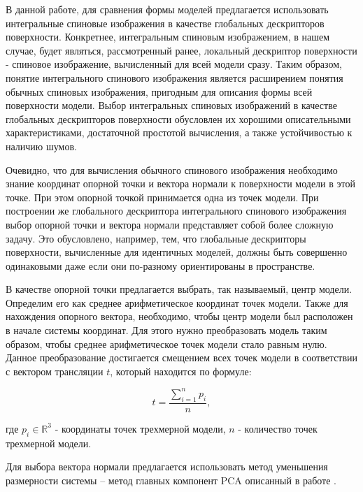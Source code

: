 \documentclass[14pt]{article}
\numberwithin{figure}{section}
\numberwithin{equation}{section}
\begin{document}
В данной работе, для сравнения формы моделей предлагается использовать интегральные спиновые изображения в качестве глобальных дескрипторов поверхности. Конкретнее, интегральным спиновым изображением, в нашем случае, будет являться, рассмотренный ранее, локальный дескриптор поверхности - спиновое изображение, вычисленный для всей модели сразу. Таким образом, понятие интегрального спинового изображения является расширением понятия обычных спиновых изображения, пригодным для описания формы всей поверхности модели.
Выбор интегральных спиновых изображений в качестве глобальных дескрипторов поверхности обусловлен их хорошими описательными характеристиками, достаточной простотой вычисления, а также устойчивостью к наличию шумов.

Очевидно, что для вычисления обычного спинового изображения необходимо знание координат опорной точки и вектора нормали к поверхности модели в этой точке. При этом опорной точкой принимается одна из точек модели. При построении же глобального дескриптора интегрального спинового изображения выбор опорной точки и вектора нормали представляет собой более сложную задачу. Это обусловлено, например, тем, что глобальные дескрипторы поверхности, вычисленные для идентичных моделей, должны быть совершенно одинаковыми даже если они по-разному ориентированы в пространстве.

В качестве опорной точки предлагается выбрать, так называемый, центр модели. Определим его как среднее арифметическое координат точек модели. Также для нахождения опорного вектора, необходимо, чтобы центр модели был расположен в начале системы координат. Для этого нужно преобразовать модель таким образом, чтобы среднее арифметическое точек модели стало равным нулю. Данное преобразование достигается смещением всех точек модели в соответствии с вектором трансляции $t$, который находится по формуле:

\begin{equation}
	t = \frac{\sum\limits^{n}_{i = 1} p_i}{n},
\end{equation}

где $p_i \in \mathbb{R}^3$ - координаты точек трехмерной модели, $n$ - количество точек трехмерной модели.

Для выбора вектора нормали предлагается использовать метод уменьшения размерности системы – метод главных компонент PCA описанный в работе \cite{Chernikoff}.
\end{document}
